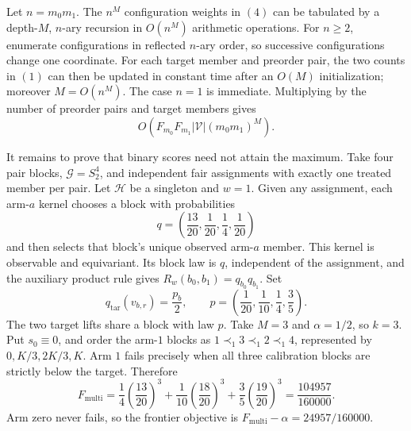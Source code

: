 Let \(n=m_0m_1\). The \(n^M\) configuration weights in \((4)\) can be tabulated by a depth-\(M\), \(n\)-ary recursion in \(O(n^M)\) arithmetic operations. For \(n\ge2\), enumerate configurations in reflected \(n\)-ary order, so successive configurations change one coordinate. For each target member and preorder pair, the two counts in \((1)\) can then be updated in constant time after an \(O(M)\) initialization; moreover \(M=O(n^M)\). The case \(n=1\) is immediate. Multiplying by the number of preorder pairs and target members gives
\[O\!\left(F_{m_0}F_{m_1}|\mathcal V|(m_0m_1)^M\right).\tag{5}\]

It remains to prove that binary scores need not attain the maximum. Take four pair blocks, \(\mathcal G=S_2^4\), and independent fair assignments with exactly one treated member per pair. Let \(\mathcal H\) be a singleton and \(w=1\). Given any assignment, each arm-\(a\) kernel chooses a block with probabilities
\[q=\left(\frac{13}{20},\frac1{20},\frac14,\frac1{20}\right)\]
and then selects that block's unique observed arm-\(a\) member. This kernel is observable and equivariant. Its block law is \(q\), independent of the assignment, and the auxiliary product rule gives \(R_w(b_0,b_1)=q_{b_0}q_{b_1}\). Set
\[q_{\mathrm{tar}}(v_{b,r})=\frac{p_b}{2},\qquad p=\left(\frac1{20},\frac1{10},\frac14,\frac35\right).\]
The two target lifts share a block with law \(p\). Take \(M=3\) and \(\alpha=1/2\), so \(k=3\). Put \(s_0\equiv0\), and order the arm-\(1\) blocks as \(1\prec_1 3\prec_1 2\prec_1 4\), represented by \(0,K/3,2K/3,K\). Arm \(1\) fails precisely when all three calibration blocks are strictly below the target. Therefore
\[F_{\mathrm{multi}}=\frac14\left(\frac{13}{20}\right)^3+\frac1{10}\left(\frac{18}{20}\right)^3+\frac35\left(\frac{19}{20}\right)^3=\frac{104957}{160000}.\tag{6}\]
Arm zero never fails, so the frontier objective is \(F_{\mathrm{multi}}-\alpha=24957/160000\).

